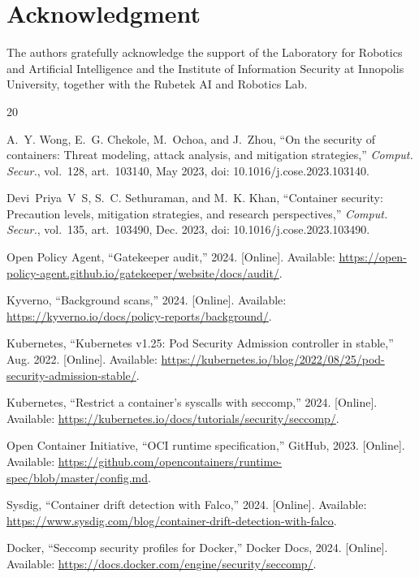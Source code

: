\documentclass[conference]{IEEEtran}
\begin{document}
\section*{Acknowledgment}

The authors gratefully acknowledge the support of the Laboratory for Robotics and Artificial Intelligence and the Institute of Information Security at Innopolis University, together with the Rubetek AI and Robotics Lab.

\balance

\begin{thebibliography}{20}

A.~Y. Wong, E.~G. Chekole, M.~Ochoa, and J.~Zhou, ``On the security of containers: Threat modeling, attack analysis, and mitigation strategies,'' \emph{Comput. Secur.}, vol.~128, art.~103140, May 2023, doi: 10.1016/j.cose.2023.103140.

Devi~Priya~V~S, S.~C. Sethuraman, and M.~K. Khan, ``Container security: Precaution levels, mitigation strategies, and research perspectives,'' \emph{Comput. Secur.}, vol.~135, art.~103490, Dec. 2023, doi: 10.1016/j.cose.2023.103490.

Open Policy Agent, ``Gatekeeper audit,'' 2024. [Online]. Available: \url{https://open-policy-agent.github.io/gatekeeper/website/docs/audit/}.

Kyverno, ``Background scans,'' 2024. [Online]. Available: \url{https://kyverno.io/docs/policy-reports/background/}.

Kubernetes, ``Kubernetes v1.25: Pod Security Admission controller in stable,'' Aug. 2022. [Online]. Available: \url{https://kubernetes.io/blog/2022/08/25/pod-security-admission-stable/}.

Kubernetes, ``Restrict a container's syscalls with seccomp,'' 2024. [Online]. Available: \url{https://kubernetes.io/docs/tutorials/security/seccomp/}.

Open Container Initiative, ``OCI runtime specification,'' GitHub, 2023. [Online]. Available: \url{https://github.com/opencontainers/runtime-spec/blob/master/config.md}.

Sysdig, ``Container drift detection with Falco,'' 2024. [Online]. Available: \url{https://www.sysdig.com/blog/container-drift-detection-with-falco}.

Docker, ``Seccomp security profiles for Docker,'' Docker Docs, 2024. [Online]. Available: \url{https://docs.docker.com/engine/security/seccomp/}.


\end{thebibliography}
\end{document}

